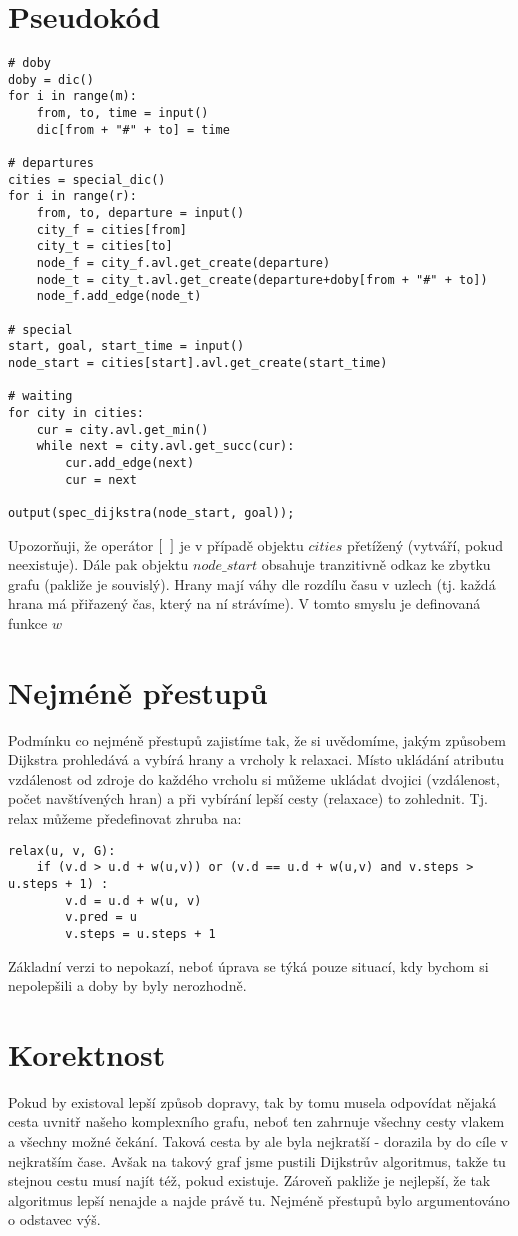 \documentclass[a4paper]{article}
\begin{document}
\section{Pseudokód}
\begin{lstlisting}
# doby
doby = dic()
for i in range(m):
	from, to, time = input()
	dic[from + "#" + to] = time
	
# departures
cities = special_dic()
for i in range(r):
	from, to, departure = input()
	city_f = cities[from]
	city_t = cities[to]
	node_f = city_f.avl.get_create(departure)
	node_t = city_t.avl.get_create(departure+doby[from + "#" + to])
	node_f.add_edge(node_t)
	
# special
start, goal, start_time = input()
node_start = cities[start].avl.get_create(start_time)

# waiting
for city in cities:
	cur = city.avl.get_min()
	while next = city.avl.get_succ(cur):
		cur.add_edge(next)
		cur = next

output(spec_dijkstra(node_start, goal));
\end{lstlisting}

Upozorňuji, že operátor $[\hspace{0.2cm}]$ je v případě objektu $cities$ přetížený (vytváří, pokud neexistuje). Dále pak objektu $node\_start$ obsahuje tranzitivně odkaz ke zbytku grafu (pakliže je souvislý). Hrany mají váhy dle rozdílu času v uzlech (tj. každá hrana má přiřazený čas, který na ní strávíme). V tomto smyslu je definovaná funkce $w$

\section{Nejméně přestupů}
Podmínku co nejméně přestupů zajistíme tak, že si uvědomíme, jakým způsobem Dijkstra prohledává a vybírá hrany a vrcholy k relaxaci. Místo ukládání atributu vzdálenost od zdroje do každého vrcholu si můžeme ukládat dvojici (vzdálenost, počet navštívených hran) a při vybírání lepší cesty (relaxace) to zohlednit.
Tj. relax můžeme předefinovat zhruba na:
\begin{lstlisting}
relax(u, v, G):
	if (v.d > u.d + w(u,v)) or (v.d == u.d + w(u,v) and v.steps > u.steps + 1) :
		v.d = u.d + w(u, v)
		v.pred = u
		v.steps = u.steps + 1
\end{lstlisting}

Základní verzi to nepokazí, neboť úprava se týká pouze situací, kdy bychom si nepolepšili a doby by byly nerozhodně.

\section{Korektnost}
Pokud by existoval lepší způsob dopravy, tak by tomu musela odpovídat nějaká cesta uvnitř našeho komplexního grafu, neboť ten zahrnuje všechny cesty vlakem a všechny možné čekání. Taková cesta by ale byla nejkratší - dorazila by do cíle v nejkratším čase. Avšak na takový graf jsme pustili Dijkstrův algoritmus, takže tu stejnou cestu musí najít též, pokud existuje. Zároveň pakliže je nejlepší, že tak algoritmus lepší nenajde a najde právě tu. Nejméně přestupů bylo argumentováno o odstavec výš.
\end{document}
